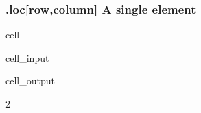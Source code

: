 \documentclass[letterpaper,10pt,english]{jupyterBook}
\begin{document}
\subsubsection{.loc{[}row,column{]} A single element}
\label{\detokenize{content/notebooks/pandas/dataframes:loc-row-column-a-single-element}}
\begin{sphinxuseclass}{cell}\begin{sphinxVerbatimInput}

\begin{sphinxuseclass}{cell_input}
\begin{sphinxVerbatim}[commandchars=\\\{\}]
\PYG{p}{[}\PYG{p}{]}
\end{sphinxVerbatim}

\end{sphinxuseclass}\end{sphinxVerbatimInput}
\begin{sphinxVerbatimOutput}

\begin{sphinxuseclass}{cell_output}
\begin{sphinxVerbatim}[commandchars=\\\{\}]
2
\end{sphinxVerbatim}

\end{sphinxuseclass}\end{sphinxVerbatimOutput}

\end{sphinxuseclass}
\end{document}
